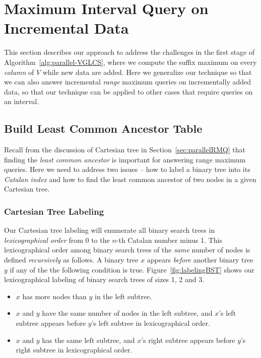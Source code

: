 \section{Maximum Interval Query on Incremental Data} \label{sec:QIUD}

This section describes our approach to address the challenges in the
first stage of Algorithm~\ref{alg:parallel-VGLCS}, where we compute
the suffix maximum on every {\em column} of $V$ while new data are
added.  Here we generalize our technique so that we can also answer
incremental {\em range} maximum queries on incrementally added data,
so that our technique can be applied to other cases that require
queries on an interval.

%

\subsection{Build Least Common Ancestor Table}

Recall from the discussion of Cartesian tree in
Section~\ref{sec:parallelRMQ} that finding the {\em least common
  ancestor} is important for answering range maximum queries.  Here we
need to address two issues -- how to label a binary tree into its {\em
  Catalan index} and how to find the least common ancestor of two
nodes in a given Cartesian tree.

\subsubsection{Cartesian Tree Labeling}

Our Cartesian tree labeling will enumerate all binary search trees in
{\em lexicographical order} from $0$ to the $n$-th Catalan number
minus 1.  This lexicographical order among binary search trees of the
{\em same} number of nodes is defined {\em recursively} as follows.  A
binary tree $x$ appears {\em before} another binary tree $y$ if any of
the the following condition is true.  Figure~\ref{fig:labelingBST}
shows our lexicographical labeling of binary search trees of sizes 1,
2 and 3.

\begin{itemize}
\item $x$ has more nodes than $y$ in the left subtree.
\item $x$ and $y$ have the same number of nodes in the left subtree,
  and $x$'s left subtree appears before $y$'s left subtree in
  lexicographical order.
\item $x$ and $y$ has the same left subtree, and $x$'s right subtree
  appears before $y$'s right subtree in lexicographical order.
\end{itemize}

